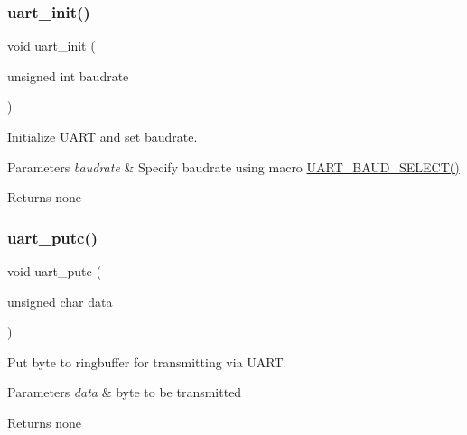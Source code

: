 \subsubsection{\texorpdfstring{uart\+\_\+init()}{uart\_init()}}
{\footnotesize\ttfamily void uart\+\_\+init (\begin{DoxyParamCaption}\item[{unsigned int}]{baudrate }\end{DoxyParamCaption})}



Initialize U\+A\+RT and set baudrate. 


\begin{DoxyParams}{Parameters}
{\em baudrate} & Specify baudrate using macro \hyperlink{group__pfleury__uart_ga367ff7b5de225ed936a63239ad4adb0b}{U\+A\+R\+T\+\_\+\+B\+A\+U\+D\+\_\+\+S\+E\+L\+E\+C\+T()} \\
\hline
\end{DoxyParams}
\begin{DoxyReturn}{Returns}
none 
\end{DoxyReturn}
\mbox{\label{group__pfleury__uart_gad975221bc08b901e4c7ad69f9c9a97e2}} 
\subsubsection{\texorpdfstring{uart\+\_\+putc()}{uart\_putc()}}
{\footnotesize\ttfamily void uart\+\_\+putc (\begin{DoxyParamCaption}\item[{unsigned char}]{data }\end{DoxyParamCaption})}



Put byte to ringbuffer for transmitting via U\+A\+RT. 


\begin{DoxyParams}{Parameters}
{\em data} & byte to be transmitted \\
\hline
\end{DoxyParams}
\begin{DoxyReturn}{Returns}
none 
\end{DoxyReturn}
\mbox{\label{group__pfleury__uart_gae52facc0a56086a365bb0018160d8d71}} 
